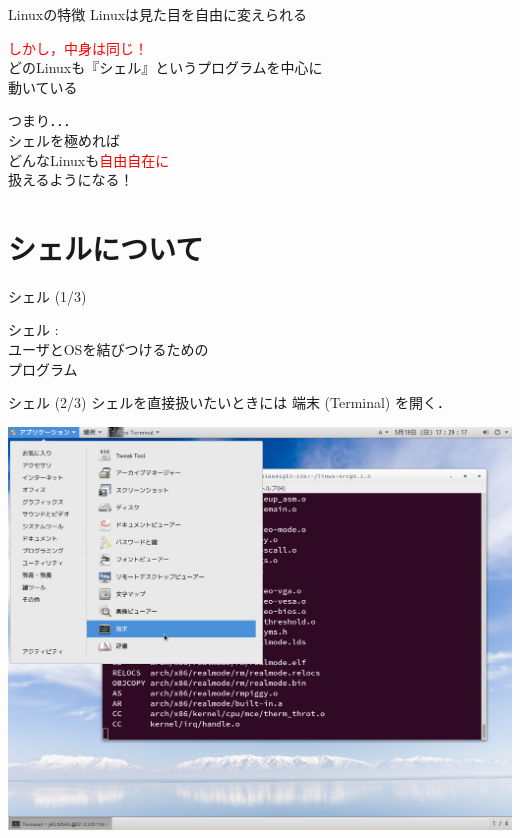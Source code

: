 \documentclass[uplatex, dvipdfmx, 12pt]{beamer}
\begin{document}
\begin{frame}{Linuxの特徴}
  Linuxは見た目を自由に変えられる
  
  \textcolor{red}{しかし，中身は同じ！}\\

  \vspace{1em}
  どのLinuxも『シェル』というプログラムを中心に\\動いている

  \pause
  \vspace{1em}
  \begin{Large}つまり．．．\\ \hspace{5em}シェルを極めれば\\\hspace{5em}どんなLinuxも\textcolor{red}{自由自在に}\\\vspace{0.4em}\hspace{5em}扱えるようになる！\end{Large}
\end{frame}

\section{シェルについて}
\begin{frame}{シェル (1/3)}
  \begin{Large}
  シェル :\\
    \vspace{1em}
  ユーザとOSを結びつけるための\\プログラム\end{Large}
\end{frame}
\begin{frame}{シェル (2/3)}
  シェルを直接扱いたいときには 端末 (Terminal) を開く．
  \begin{center}\includegraphics[height=0.9\textheight]{./figures/Terminal.png}\end{center}
\end{frame}
\end{document}
